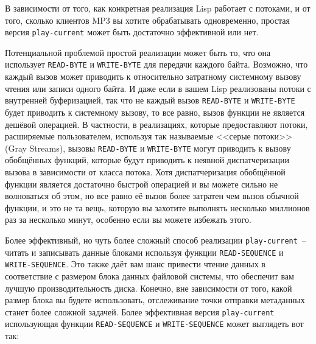В зависимости от того, как конкретная реализация Lisp работает с потоками, и от того,
сколько клиентов MP3 вы хотите обрабатывать одновременно, простая версия
\lstinline{play-current} может быть достаточно эффективной или нет.

Потенциальной проблемой простой реализации может быть то, что она использует
\lstinline{READ-BYTE} и \lstinline{WRITE-BYTE} для передачи каждого байта. Возможно, что каждый
вызов может приводить к относительно затратному системному вызову чтения или записи одного
байта.  И даже если в вашем Lisp реализованы потоки с внутренней буферизацией, так что не
каждый вызов \lstinline{READ-BYTE} и \lstinline{WRITE-BYTE} будет приводить к системному вызову, то
все равно, вызов функции не является дешёвой операцией.  В частности, в реализациях,
которые предоставляют потоки, расширяемые пользователем, используя так называемые <<серые
потоки>> (Gray Streams), вызовы \lstinline{READ-BYTE} и \lstinline{WRITE-BYTE} могут приводить к
вызову обобщённых функций, которые будут приводить к неявной диспатчеризации вызова в
зависимости от класса потока.  Хотя диспатчеризация обобщённой функции является достаточно
быстрой операцией и вы можете сильно не волноваться об этом, но все равно её вызов более
затратен чем вызов обычной функции, и это не та вещь, которую вы захотите выполнять
несколько миллионов раз за несколько минут, особенно если вы можете избежать этого.

Более эффективный, но чуть более сложный способ реализации \lstinline{play-current}~-- читать и
записывать данные блоками используя функции \lstinline{READ-SEQUENCE} и \lstinline{WRITE-SEQUENCE}.
Это также даёт вам шанс привести чтение данных в соответствие с размером блока данных
файловой системы, что обеспечит вам лучшую производительность диска.  Конечно, вне
зависимости от того, какой размер блока вы будете использовать, отслеживание точки
отправки метаданных станет более сложной задачей.  Более эффективная версия
\lstinline{play-current} использующая функции \lstinline{READ-SEQUENCE} и \lstinline{WRITE-SEQUENCE}
может выглядеть вот так:

